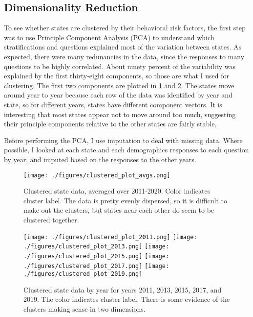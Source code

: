 \documentclass[11pt]{article}
\begin{document}
\subsection{Dimensionality Reduction}
To see whether states are clustered by their behavioral risk factors, the first step was to use Principle Component Analysis (PCA) to understand which stratifications and questions explained most of the variation between states. As expected, there were many redunancies in the data, since the responses to many questions to be highly correlated. About ninety percent of the variability was explained by the first thirty-eight components, so those are what I used for clustering. The first two components are plotted in  \ref{fig:clustered_avgs} and \ref{fig:clustered_data}. The states move around year to year because each row of the data was identified by year and state, so for different years, states have different component vectors. It is interesting that most states appear not to move around too much, suggesting their principle components relative to the other states are fairly stable.

Before performing the PCA, I use imputation to deal with missing data. Where possible, I looked at each state and each demographics responses to each question by year, and imputed based on the responses to the other years.

\begin{figure}[hp]
\texttt{[image: ./figures/clustered\_plot\_avgs.png]}
\caption{
  Clustered state data, averaged over 2011-2020. Color indicates cluster label. The data is pretty evenly dispersed, so it is difficult to make out the clusters, but states near each other do seem to be clustered together.
}
\label{fig:clustered_avgs}
\end{figure}

\begin{figure}[hp]
\texttt{[image: ./figures/clustered\_plot\_2011.png]}
\texttt{[image: ./figures/clustered\_plot\_2013.png]}
\texttt{[image: ./figures/clustered\_plot\_2015.png]}
\texttt{[image: ./figures/clustered\_plot\_2017.png]}
\texttt{[image: ./figures/clustered\_plot\_2019.png]}
\caption{
  Clustered state data by year for years 2011, 2013, 2015, 2017, and 2019. The color indicates cluster label. There is some evidence of the clusters making sense in two dimensions.
}
\label{fig:clustered_data}
\end{figure}
\end{document}
